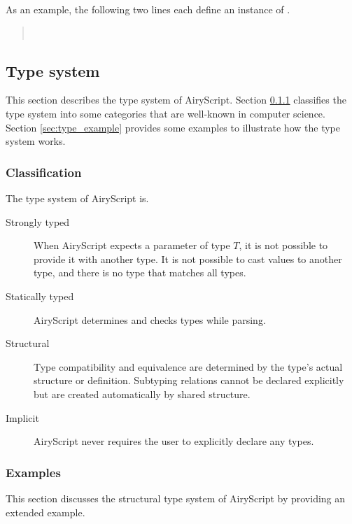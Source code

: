 As an example, the following two lines each define an instance of .
\begin{quote}
  \tye{[1,2,3,4]}\\
  \tye{[   5 , 2,1,2]}
\end{quote}


\subsection{Type system}
\label{sec:structural_type_system}
This section describes the type system of AiryScript. Section
\ref{sec:type_classification} classifies the type system into some categories
that are well-known in computer science. Section \ref{sec:type_example} provides
some examples to illustrate how the type system works.

\subsubsection{Classification}
\label{sec:type_classification}
The type system of AiryScript is.
\begin{description}
  \item[Strongly typed] When AiryScript expects a parameter of type $T$, it is
    not possible to provide it with another type. It is not possible to cast
    values to another type, and there is no type that matches all types.
  \item[Statically typed] AiryScript determines and checks types while parsing.
  \item[Structural] Type compatibility and equivalence are determined by the
    type’s actual structure or definition. Subtyping relations cannot be
    declared explicitly but are created automatically by shared structure.
  \item[Implicit] AiryScript never requires the user to explicitly declare any
    types.
\end{description}

\subsubsection{Examples}
\label{sec:type_examples}
This section discusses the structural type system of AiryScript by providing an
extended example.

